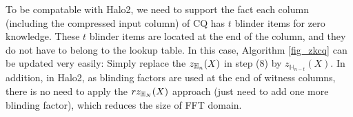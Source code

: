 To be compatable with Halo2, we need to support the fact each column
(including the compressed input column) of CQ has $t$ blinder
items for zero knowledge. These $t$ blinder items are located
at the end of the column, and they do not have to belong
to the lookup table.
In this case, Algorithm
\ref{fig_zkcq} can be updated very easily: Simply
replace the $z_{\mathbb{H}_{n}}(X)$ in step (8) by
$z_{\mathbb{H}_{n-t}}(X)$. In addition, in Halo2, as blinding
factors are used at the end of witness columns, there is no 
need to apply the $r z_{\mathbb{H}_{N}}(X)$ approach (just need to add one more
blinding factor), which reduces the size of FFT domain.


